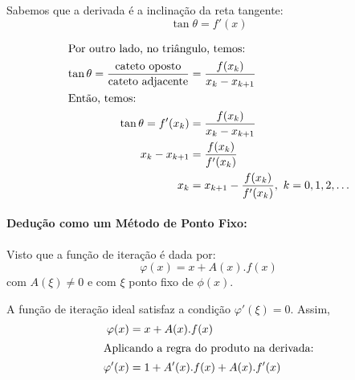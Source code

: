 \documentclass{article}
\begin{document}
            \begin{multicols}{2}
                Sabemos que a derivada é a inclinação da reta tangente:
                \[\tan{\theta} = f'(x)\]
                \vfill
                \begin{figure}[H]
                    \centering
                \end{figure}
            \end{multicols}

            \begin{align*}
                \shortintertext{Por outro lado, no triângulo, temos:}
                \tan{\theta} = \frac{\text{cateto oposto}}{\text{cateto adjacente}} &= \frac{f(x_{k})}{x_{k} - x_{k+1}}\\
                \shortintertext{Então, temos:}
                \tan{\theta} = f'(x_k) &= \frac{f(x_k)}{x_k - x_{k+1}}\\
                x_k - x_{k+1} &= \frac{f(x_k)}{f'(x_k)}\\
                x_k &= x_{k+1} - \frac{f(x_k)}{f'(x_k)},~k=0,1,2, \ldots\\
            \end{align*}

            \paragraph{Dedução como um Método de Ponto Fixo:}
            Visto que a função de iteração é dada por:
            \[\varphi(x) = x + A(x).f(x)\]
            com $A(\xi) \neq 0$ e com $\xi$ ponto fixo de $\phi(x)$.

            A função de iteração ideal satisfaz a condição $\varphi'(\xi) = 0$. Assim,
            \begin{align*}
                \varphi(x) &= x + A(x).f(x)\\
                \shortintertext{Aplicando a regra do produto na derivada:}
                \varphi'(x) &= 1 + A'(x).f(x) + A(x).f'(x)\\
            \end{align*}
\end{document}
